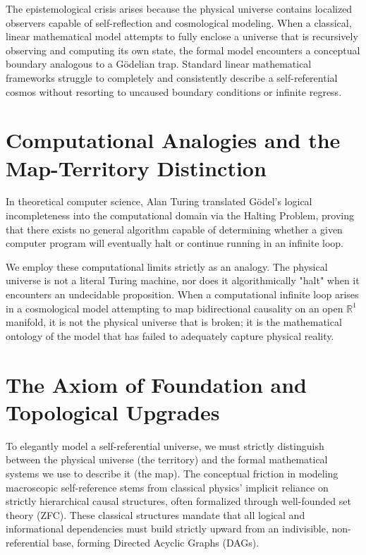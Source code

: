 \documentclass[12pt,openany]{book}
\theoremstyle{plain}
\theoremstyle{definition}
\theoremstyle{remark}
\begin{document}
The epistemological crisis arises because the physical universe contains localized observers capable of self-reflection and cosmological modeling. When a classical, linear mathematical model attempts to fully enclose a universe that is recursively observing and computing its own state, the formal model encounters a conceptual boundary analogous to a Gödelian trap. Standard linear mathematical frameworks struggle to completely and consistently describe a self-referential cosmos without resorting to uncaused boundary conditions or infinite regress.

\section{Computational Analogies and the Map-Territory Distinction}
In theoretical computer science, Alan Turing translated Gödel's logical incompleteness into the computational domain via the Halting Problem, proving that there exists no general algorithm capable of determining whether a given computer program will eventually halt or continue running in an infinite loop. 

We employ these computational limits strictly as an analogy. The physical universe is not a literal Turing machine, nor does it algorithmically "halt" when it encounters an undecidable proposition. When a computational infinite loop arises in a cosmological model attempting to map bidirectional causality on an open $\mathbb{R}^1$ manifold, it is not the physical universe that is broken; it is the mathematical ontology of the model that has failed to adequately capture physical reality. 

\section{The Axiom of Foundation and Topological Upgrades}

To elegantly model a self-referential universe, we must strictly distinguish between the physical universe (the territory) and the formal mathematical systems we use to describe it (the map). The conceptual friction in modeling macroscopic self-reference stems from classical physics' implicit reliance on strictly hierarchical causal structures, often formalized through well-founded set theory (ZFC). These classical structures mandate that all logical and informational dependencies must build strictly upward from an indivisible, non-referential base, forming Directed Acyclic Graphs (DAGs).
\end{document}
